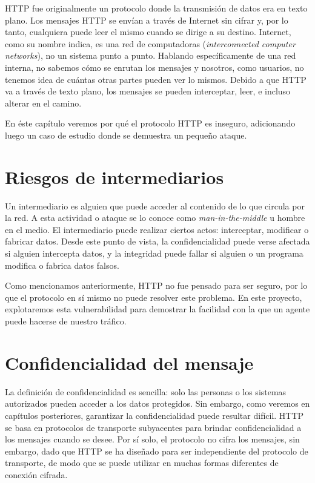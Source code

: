 


HTTP fue originalmente un protocolo donde la transmisión de datos era en texto 
plano. Los mensajes HTTP se envían a través de Internet sin cifrar y, por 
lo tanto, cualquiera puede leer el mismo cuando se dirige a su destino. 
Internet, como su nombre indica, es una red de computadoras 
(\emph{interconnected computer networks}), no un sistema 
punto a punto. Hablando específicamente de una red interna, no sabemos cómo 
se enrutan los 
mensajes y nosotros, como usuarios, no tenemos idea de cuántas otras partes 
pueden ver lo mismos. Debido a que HTTP va a través de texto plano, 
los mensajes se pueden interceptar, leer, e incluso alterar en el camino.

En éste capítulo veremos por qué el protocolo HTTP es inseguro, adicionando
luego un 
caso de estudio donde se demuestra un pequeño ataque.

\section{Riesgos de intermediarios}

Un intermediario es alguien que puede acceder al contenido de lo que circula por 
la red. A esta actividad o ataque se lo conoce como \emph{man-in-the-middle} u 
hombre en el medio. 
El intermediario puede realizar ciertos actos: interceptar, modificar o 
fabricar datos. Desde este punto de vista, la confidencialidad puede verse 
afectada si alguien intercepta datos, y la integridad puede fallar si 
alguien o un programa modifica o fabrica datos falsos. 

Como mencionamos anteriormente, HTTP no fue pensado para ser seguro, por lo que 
el protocolo en sí mismo no puede resolver este problema.
En este proyecto, explotaremos esta vulnerabilidad para demostrar la facilidad
 con la que un agente puede hacerse de nuestro tráfico.




\section{Confidencialidad del mensaje}
La definición de confidencialidad es sencilla: solo las personas o los 
sistemas autorizados pueden acceder a los datos protegidos.
Sin embargo, como veremos en capítulos posteriores, garantizar la confidencialidad 
puede resultar difícil.
 HTTP se basa en 
protocolos de transporte subyacentes para brindar confidencialidad a los 
mensajes cuando se desee. Por sí solo, el protocolo no cifra los mensajes, 
sin embargo, dado que HTTP se ha diseñado para ser independiente del protocolo de 
transporte, de modo que se puede utilizar en muchas formas diferentes de 
conexión cifrada.

